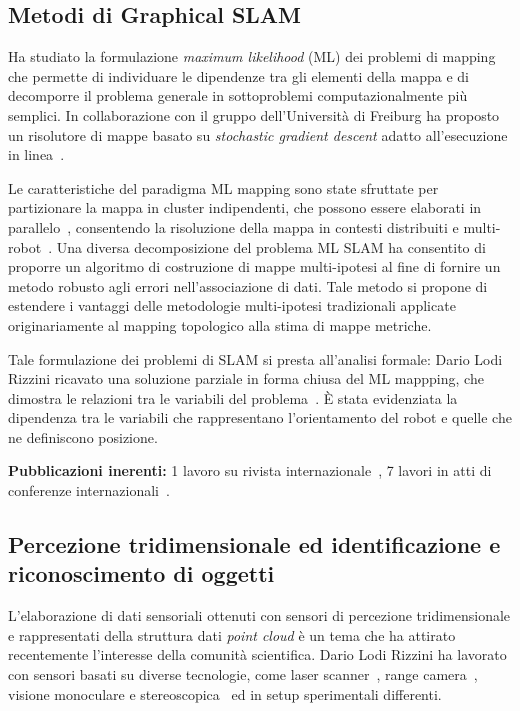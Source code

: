 \documentclass[11pt]{article}
\begin{document}
\subsection*{Metodi di Graphical SLAM}

Ha studiato la formulazione \emph{maximum likelihood} (ML) dei problemi di mapping
che permette di individuare le dipendenze tra gli elementi della mappa e di decomporre il 
problema generale in sottoproblemi computazionalmente pi\`u semplici. 
In collaborazione con il gruppo dell'Universit\`a di Freiburg ha
proposto un risolutore di mappe basato su \emph{stochastic gradient descent} adatto 
all'esecuzione in linea~\cite{grisetti2008icra,lodirizzini2009ras}. 

Le caratteristiche del paradigma ML mapping sono state sfruttate per partizionare la mappa 
in cluster indipendenti, che possono essere elaborati in parallelo~\cite{lodirizzini2009iros}, consentendo
la risoluzione della mappa in contesti distribuiti e multi-robot~\cite{lodirizzini2010iros,lodirizzini2010graphbot}.
Una diversa decomposizione del problema ML SLAM ha consentito di proporre
un algoritmo di costruzione di mappe multi-ipotesi al fine di 
fornire un metodo robusto agli errori nell'associazione di dati\cite{lodirizzini2011icra}.
Tale metodo si propone di estendere i vantaggi delle metodologie multi-ipotesi tradizionali applicate
originariamente al mapping topologico alla stima di mappe metriche. 

Tale formulazione dei problemi di SLAM si presta all'analisi formale:
Dario Lodi Rizzini ricavato una soluzione parziale in forma chiusa del ML mappping, 
che dimostra le relazioni tra le variabili del problema~\cite{lodirizzini2009ecmr,lodirizzini2009icar}.
\`E stata evidenziata la dipendenza tra le variabili 
che rappresentano l'orientamento del robot e quelle che ne definiscono posizione.

\textbf{Pubblicazioni inerenti:}
1 lavoro su rivista internazionale~\cite{lodirizzini2009ras},
7 lavori in atti di conferenze internazionali~\cite{
lodirizzini2011icra,lodirizzini2010iros,lodirizzini2010graphbot,
lodirizzini2009iros,lodirizzini2009ecmr,lodirizzini2009icar,grisetti2008icra}.

\subsection*{Percezione tridimensionale ed identificazione e riconoscimento di oggetti}

L'elaborazione di dati sensoriali ottenuti con sensori di percezione tridimensionale e 
rappresentati della struttura dati \emph{point cloud} \`e un tema che ha attirato recentemente l'interesse 
della comunit\`a scientifica. 
Dario Lodi Rizzini ha lavorato con sensori basati su diverse tecnologie, come laser scanner~\cite{aleotti2014jirs,aleotti2012icra},
range camera~\cite{aleotti2014iros,lodirizzini2014ias}, visione monoculare e stereoscopica~\cite{lodirizzini2015ijars,
oleari2014ifac,oleari2013iccp} ed in setup sperimentali differenti.
\end{document}
